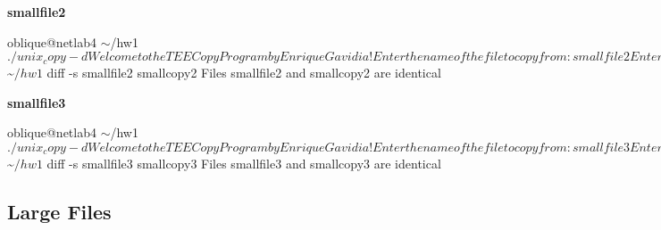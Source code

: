 \documentclass[12pt]{article}
\newcommand {\filename}[1] {\flushleft \textbf{#1}}
\newcommand {\mytilde} {$\sim$}
\begin{document}
\filename{smallfile2}
\begin{shelloutput}
oblique@netlab4 \mytilde/hw1 $ ./unix_copy -d
Welcome to the TEE Copy Program by Enrique Gavidia!
Enter the name of the file to copy from:
smallfile2
Enter the name of the file to copy to:
smallcopy2

--------
BUFFER: This is a t
--------
This is a t
--------
BUFFER: est for the
--------
est for the
--------
BUFFER:  csc 415 fi
--------
 csc 415 fi
--------
BUFFER: le-copy ass
--------
le-copy ass
--------
BUFFER: ignment.

--------
ignment.
File copy successful, 53 bytes copied

oblique@netlab4 \mytilde/hw1 $ diff -s smallfile2 smallcopy2
Files smallfile2 and smallcopy2 are identical
\end{shelloutput}


\filename{smallfile3}
\begin{shelloutput}
oblique@netlab4 \mytilde/hw1 $ ./unix_copy -d
Welcome to the TEE Copy Program by Enrique Gavidia!
Enter the name of the file to copy from:
smallfile3
Enter the name of the file to copy to:
smallcopy3

--------
BUFFER: meow meow m
--------
meow meow m
--------
BUFFER: eow meow me
--------
eow meow me
--------
BUFFER: ow meow meo
--------
ow meow meo
--------
BUFFER: w meow

--------
w meow
File copy successful, 40 bytes copied

oblique@netlab4 \mytilde/hw1 $ diff -s smallfile3 smallcopy3
Files smallfile3 and smallcopy3 are identical
\end{shelloutput}



\subsection*{Large Files}
\end{document}
